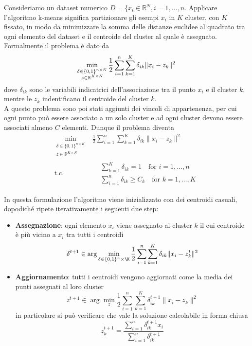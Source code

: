 \documentclass{article}
\begin{document}
    Consideriamo un dataset numerico $D=\{x_i \in \mathbb{R}^{N}, i=1,\dots,n$. Applicare l'algoritmo k-means significa partizionare gli esempi $x_i$ in $K$ cluster, con $K$ fissato, in modo da minimizzare la somma delle distanze euclidee al quadrato tra ogni elemento del dataset e il centroide del cluster al quale è assegnato.
    Formalmente il problema è dato da
    \begin{equation}
        \min_{\begin{subarray}{c}
                  \delta \in \{0, 1\}^{n \times K}\\
                  z \in \mathbb{R}^{K \times N}
        \end{subarray}}
        \frac{1}{2} \sum_{i=1}^{n} \sum_{k=1}^{K} \delta_{ik} \|x_i-z_k\|^2
        \label{eq:kmeans}
    \end{equation}
    dove $\delta_{ik}$ sono le variabili indicatrici dell'associazione tra il punto $x_i$ e il cluster $k$, mentre le $z_k$ indentificano il centroide del cluster $k$.\\
    A questo problema sono poi stati aggiunti dei vincoli di appartenenza, per cui ogni punto può essere associato a un solo cluster e ad ogni cluster devono essere associati almeno $C$ elementi. Dunque il problema diventa
    \begin{equation}
        \begin{aligned}
            \min_{\substack{
                \delta \in \{0, 1\}^{n \times K}\\
                z \in \mathbb{R}^{K \times N}}} &
            \frac{1}{2} \sum_{i=1}^{n} \sum_{k=1}^{K} \delta_{ik} \|x_i-z_k\|^2 \\
            \text{t.c.} \quad &
            \begin{aligned}
                & \sum_{k=1}^{K} \delta_{ik} = 1 \quad \text{for $i=1,\dots,n$}\\
                & \sum_{i=1}^{n} \delta_{ik} \geq C_k \quad \text{for $k=1,\dots,K$}
            \end{aligned}
        \end{aligned}
        \label{eq:constrained_kmeans}
    \end{equation}

    In questa formulazione l'algoritmo viene inizializzato con dei centroidi casuali, dopodiché ripete iterativamente i seguenti due step:
    \begin{itemize}
        \item \textbf{Assegnazione}: ogni elemento $x_i$ viene assegnato al cluster $k$ il cui centroide è più vicino a $x_i$ tra tutti i centroidi
        \[\delta^{t+1} \in \arg \min_{\delta \in \{0,1\}^n\times \K} \frac{1}{2} \sum_{i=1}^{n} \sum_{k=1}^{K} \delta_{ik} \|x_i-z_k^{t}\|^2\]
        \item \textbf{Aggiornamento}: tutti i centroidi vengono aggiornati come la media dei punti assegnati al loro cluster
        \[z^{t+1} \in \arg \min_{z} \frac{1}{2} \sum_{i=1}^{n} \sum_{k=1}^{K} \delta_{ik}^{t+1} \|x_i-z_k\|^2\]
        in particolare si può verificare che vale la soluzione calcolabile in forma chiusa
        \[z_k^{t+1} = \frac{\sum_{i=1}^{n} \delta_{ik}^{t+1} x_i}{\sum_{i=1}^{n} \delta_{ik}^{t+1}}\]
    \end{itemize}
\end{document}
